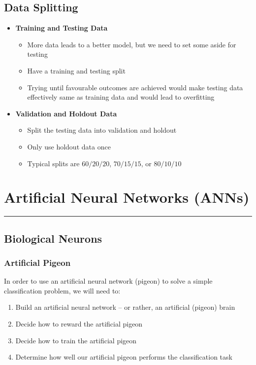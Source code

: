 \documentclass[11pt]{article}
\begin{document}
\subsection{Data Splitting}
\begin{itemize}
\item \textbf{Training and Testing Data}
\begin{itemize}
\item More data leads to a better model, but we need to set some aside for testing
\item Have a training and testing split
\item Trying until favourable outcomes are achieved would make testing data effectively same as training data and would lead to overfitting
\end{itemize}
\item \textbf{Validation and Holdout Data}
\begin{itemize}
\item Split the testing data into validation and holdout
\item Only use holdout data once
\item Typical splits are $60/20/20$, $70/15/15$,  or $80/10/10$
\end{itemize}
\end{itemize}


\pagebreak



\section{Artificial Neural Networks (ANNs)}
\hrule \vspace{15pt}

\subsection{Biological Neurons}
\subsubsection{Artificial Pigeon}
In order to use an artificial neural network (pigeon) to solve a simple classification problem, we will need to:
\begin{enumerate}
\item Build an artificial neural network -- or rather,  an artificial (pigeon) brain
\item Decide how to reward the artificial pigeon
\item Decide how to train the artificial pigeon
\item Determine how well our artificial pigeon performs the classification task
\end{enumerate}
\end{document}
